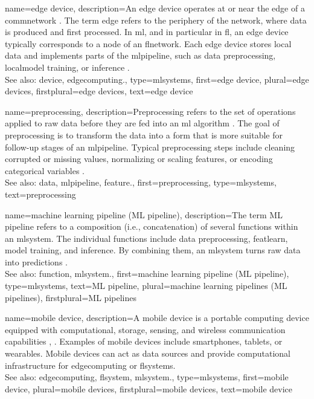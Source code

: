 {name={edge device},
	description={An edge \gls{device} operates at or 
		near the edge of a \gls{commnetwork} \cite{Shi2016}. The term edge refers 
		to the periphery of the network, where \gls{data} is produced and first processed.
		In \gls{ml}, and in particular in \gls{fl}, an edge \gls{device} 
		typically corresponds to a node of an \gls{flnetwork}. Each edge \gls{device} 
		stores local \gls{data} and implements parts of the \gls{mlpipeline}, 
		such as \gls{data} \gls{preprocessing}, \gls{localmodel} \gls{training}, 
		or \gls{inference} \cite{Hashash2021}. 
		\\ 
		See also: \gls{device}, \gls{edgecomputing}.},
	type=mlsystems,
	first={edge device},
	plural={edge devices},
	firstplural={edge devices},
	text={edge device}
}

{name={preprocessing},
	description={Preprocessing refers to the set of operations
		applied to raw \gls{data} before they are fed into an \gls{ml} \gls{algorithm} \cite{hastie01statisticallearning}. 
		The goal of preprocessing is to transform the \gls{data} into a form
		that is more suitable for follow-up stages of an \gls{mlpipeline}. 
		Typical preprocessing steps include cleaning corrupted or missing values,
		normalizing or scaling \glspl{feature}, or encoding categorical variables \cite{MLPipeline}. 
		\\
		See also: \gls{data}, \gls{mlpipeline}, \gls{feature}.},
	first={preprocessing},
	type=mlsystems,
	text={preprocessing}
}

{name={machine learning pipeline (ML pipeline)},
	description={The term ML pipeline refers to a composition (i.e., concatenation)
		of several \glspl{function} within an \gls{mlsystem}. The individual \glspl{function} 
		include \gls{data} \gls{preprocessing}, \gls{featlearn}, \gls{model} \gls{training}, and \gls{inference}. 
		By combining them, an \gls{mlsystem} turns raw \gls{data} into \glspl{prediction} \cite{MLPipeline}.  
		\\
		See also: \gls{function}, \gls{mlsystem}.},
	first={machine learning pipeline (ML pipeline)},
	type=mlsystems,
	text={ML pipeline},
	plural={machine learning pipelines (ML pipelines)},
	firstplural={ML pipelines}
}

{name={mobile device},
	description={A mobile \gls{device} is a portable computing
		\gls{device} equipped with computational, storage, sensing, and wireless
		communication capabilities \cite{Lane2015}, \cite{Tsoukas2024}. 
		Examples of mobile \glspl{device} include smartphones, tablets, 
		or wearables. Mobile \glspl{device} can act as \gls{data} sources 
		and provide computational infrastructure for \gls{edgecomputing} 
		or \glspl{flsystem}.
		\\
		See also: \gls{edgecomputing}, \gls{flsystem}, \gls{mlsystem}.},
	type=mlsystems,
	first={mobile device},
	plural={mobile devices},
	firstplural={mobile devices},
	text={mobile device}
}

